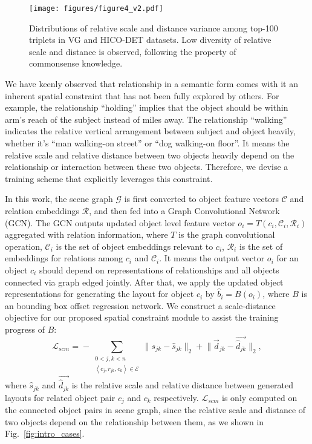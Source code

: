 \begin{figure}[!t]
\centering
\texttt{[image: figures/figure4\_v2.pdf]}
\caption{Distributions of relative scale and distance variance among top-100 triplets in VG and HICO-DET datasets. Low diversity of relative scale and distance is observed, following the property of commonsense knowledge.}
\label{fig:scale_dist_variance}
\end{figure}

We have keenly observed that relationship in a semantic form comes with it an inherent spatial constraint that has not been fully explored by others. For example, the relationship ``holding'' implies that the object should be within arm's reach of the subject instead of miles away. The relationship ``walking'' indicates the relative vertical arrangement between subject and object heavily, whether it's ``man walking-on street'' or ``dog walking-on floor''. It means the relative scale and relative distance between two objects heavily depend on the relationship or interaction between these two objects. Therefore, we devise a training scheme that explicitly leverages this constraint. 

In this work, the scene graph $\mathcal{G}$ is first converted to object feature vectors $\mathcal{C}$ and relation embeddings $\mathcal{R}$, and then fed into a Graph Convolutional Network (GCN). The GCN outputs updated object level feature vector $o_i = T(c_i,\mathcal{C}_i, \mathcal{R}_i)$ aggregated with relation information, where $T$ is the graph convolutional operation, $\mathcal{C}_i$ is the set of object embeddings relevant to $c_i$, $\mathcal{R}_i$ is the set of embeddings for relations among $c_i$ and $\mathcal{C}_i$. It means the output vector $o_i$ for an object $c_i$ should depend on representations of relationships and all objects connected via graph edged jointly. After that, we apply the updated object representations for generating the layout for object $c_i$ by $\widehat{b}_i = B(o_i)$, where $B$ is an bounding box offset regression network. We construct a scale-distance objective for our proposed spatial constraint module to assist the training progress of $B$:
\begin{equation}
    \mathcal{L}_{scm}\!=\!-\sum_{\substack{0<j,k<n \\ \left \langle c_j, r_{jk}, c_k \right \rangle\in\mathcal{E}}}\parallel s_{jk} - \widehat{s}_{jk} \parallel_2\!+\!\parallel \Vec{d}_{jk} - \Vec{\widehat{d}_{jk}}\parallel_2,
\end{equation}
where $\widehat{s}_{jk}$ and $\Vec{\widehat{d}_{jk}}$ is the relative scale and relative distance between generated layouts for related object pair $c_j$ and $c_k$ respectively. $\mathcal{L}_{scm}$ is only computed on the connected object pairs in scene graph, since the relative scale and distance of two objects depend on the relationship between them, as we shown in Fig.~\ref{fig:intro_cases}. 


